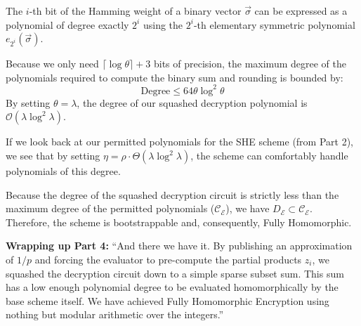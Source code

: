 \documentclass[11pt]{article}
\begin{document}
\begin{lemma}
The $i$-th bit of the Hamming weight of a binary vector $\vec{\sigma}$ can be expressed as a polynomial of degree exactly $2^i$ using the $2^i$-th elementary symmetric polynomial $e_{2^i}(\vec{\sigma})$.
\end{lemma}

Because we only need $\lceil \log \theta \rceil + 3$ bits of precision, the maximum degree of the polynomials required to compute the binary sum and rounding is bounded by:
\begin{equation}
    \text{Degree} \le 64 \theta \log^2 \theta
\end{equation}
By setting $\theta = \lambda$, the degree of our squashed decryption polynomial is $\mathcal{O}(\lambda \log^2 \lambda)$. 

If we look back at our permitted polynomials for the SHE scheme (from Part 2), we see that by setting $\eta = \rho \cdot \Theta(\lambda \log^2 \lambda)$, the scheme can comfortably handle polynomials of this degree.

\begin{theorem}
Because the degree of the squashed decryption circuit is strictly less than the maximum degree of the permitted polynomials ($\mathcal{C}_{\mathcal{E}}$), we have $D_{\mathcal{E}} \subset \mathcal{C}_{\mathcal{E}}$. Therefore, the scheme is bootstrappable and, consequently, Fully Homomorphic.
\end{theorem}

\begin{speakernote}
\textbf{Wrapping up Part 4:}
``And there we have it. By publishing an approximation of $1/p$ and forcing the evaluator to pre-compute the partial products $z_i$, we squashed the decryption circuit down to a simple sparse subset sum. This sum has a low enough polynomial degree to be evaluated homomorphically by the base scheme itself. We have achieved Fully Homomorphic Encryption using nothing but modular arithmetic over the integers.''
\end{speakernote}
\end{document}
